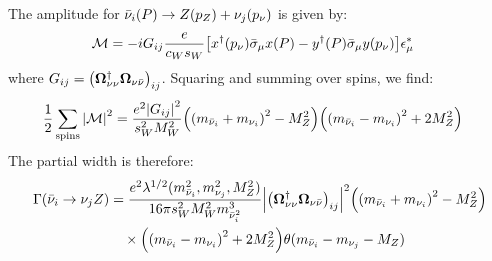 The amplitude for \(\bar{\nu}_{i}(P) \to Z(p_{Z}) + \nu_j(p_{\nu})\) is given by:
\begin{align}
    \mathcal{M} & = -iG_{ij} \frac{e}{c_{W}s_{W}}\qty[x^{\dagger}(p_{\nu})\bar{\sigma}_{\mu}x(P)
        - y^{\dagger}(P)\bar{\sigma}_{\mu}y(p_{\nu})]\epsilon^{*}_{\mu}
\end{align}
where \(G_{ij} = \qty(\bm{\Omega}_{\nu\nu}^{\dagger}\bm{\Omega}_{\nu\bar{\nu}})_{ij}\). Squaring and summing
over spins, we find:
\begin{align}
    \frac{1}{2}\sum_{\mathrm{spins}}\qty|\mathcal{M}|^2
     & =
    \frac{e^{2}\qty|G_{ij}|^2}{s^{2}_{W}M_{W}^{2}}
    \qty(\qty(m_{\bar{\nu}_{i}}+m_{\nu_{i}})^{2}-M_{Z}^{2})
    \qty(\qty(m_{\bar{\nu}_{i}}-m_{\nu_{i}})^{2}+2M_{Z}^{2})
\end{align}
The partial width is therefore:
\begin{align}
    \Gamma(\bar{\nu}_{i}\to \nu_{j}Z)
     & =
    \frac{e^{2}\lambda^{1/2}(m^{2}_{\bar{\nu}_{i}},m_{\nu_{j}}^2,M_{Z}^{2})}{16\pi s^{2}_{W}M^{2}_{W}m^{3}_{\bar{\nu}^{2}_{i}}}
    \qty|\qty(\bm{\Omega}_{\nu\nu}^{\dagger}\bm{\Omega}_{\nu\bar{\nu}})_{ij}|^2
    \qty(\qty(m_{\bar{\nu}_{i}}+m_{\nu_{i}})^{2}-M_{Z}^{2})\notag          \\
     & \quad\times\qty(\qty(m_{\bar{\nu}_{i}}-m_{\nu_{i}})^{2}+2M_{Z}^{2})
    \theta(m_{\bar{\nu}_{i}}-m_{\nu_{j}}-M_{Z})
\end{align}
